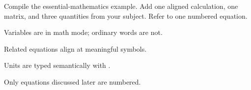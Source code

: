 \begin{codelab}
Compile the essential-mathematics example. Add one aligned calculation, one
matrix, and three quantities from your subject. Refer to one numbered equation.
\end{codelab}

\begin{chapterchecklist}
  \item Variables are in math mode; ordinary words are not.
  \item Related equations align at meaningful symbols.
  \item Units are typed semantically with .
  \item Only equations discussed later are numbered.
\end{chapterchecklist}
